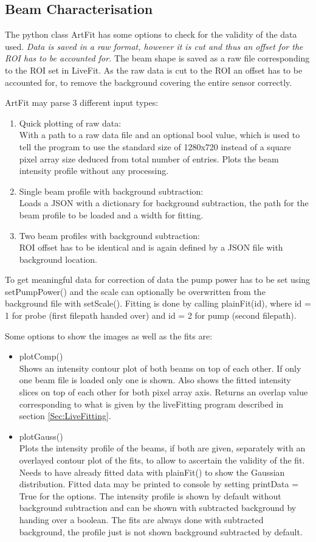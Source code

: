 \documentclass[twoside,openright]{scrreprt}
\begin{document}
\subsection{Beam Characterisation}
The python class ArtFit has some options to check for the validity of the data used. \textit{Data is saved in a raw format, however it is cut and thus an offset for the ROI has to be accounted for.} The beam shape is saved as a raw file corresponding to the ROI set in LiveFit. As the raw data is cut to the ROI an offset has to be accounted for, to remove the background covering the entire sensor correctly.

ArtFit may parse 3 different input types:
\begin{enumerate}
\item Quick plotting of raw data:\\
With a path to a raw data file and an optional bool value, which is used to tell the program to use the standard size of 1280x720 instead of a square pixel array size deduced from total number of entries. Plots the beam intensity profile without any processing.
\item Single beam profile with background subtraction: \\
Loads a JSON with a dictionary for background subtraction, the path for the beam profile to be loaded and a width for fitting.
\item Two beam profiles with background subtraction: \\
ROI offset has to be identical and is again defined by a JSON file with background location.
\end{enumerate}

To get meaningful data for correction of data the pump power has to be set using setPumpPower() and the scale can optionally be overwritten from the background file with setScale(). Fitting is done by calling plainFit(id), where id = 1 for probe (first filepath handed over) and id = 2 for pump (second filepath).

Some options to show the images as well as the fits are:
\begin{itemize}
\item plotComp()\\
Shows an intensity contour plot of both beams on top of each other. If only one beam file is loaded only one is shown. Also shows the fitted intensity slices on top of each other for both pixel array axis. Returns an overlap value corresponding to what is given by the liveFitting program described in section \ref{Sec:LiveFitting}.
\item plotGauss()\\
Plots the intensity profile of the beams, if both are given, separately with an overlayed contour plot of the fits, to allow to ascertain the validity of the fit. Needs to have already fitted data with plainFit() to show the Gaussian distribution. Fitted data may be printed to console by setting printData = True for the options. The intensity profile is shown by default without background subtraction and can be shown with subtracted background by handing over a boolean. The fits are always done with subtracted background, the profile just is not shown background subtracted by default.
\end{itemize}
\end{document}
